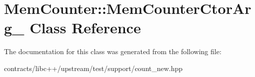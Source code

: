 \hypertarget{class_mem_counter_1_1_mem_counter_ctor_arg__}{}\section{Mem\+Counter\+:\+:Mem\+Counter\+Ctor\+Arg\+\_\+ Class Reference}
\label{class_mem_counter_1_1_mem_counter_ctor_arg__}


The documentation for this class was generated from the following file\+:\begin{DoxyCompactItemize}
\item 
contracts/libc++/upstream/test/support/count\+\_\+new.\+hpp\end{DoxyCompactItemize}
